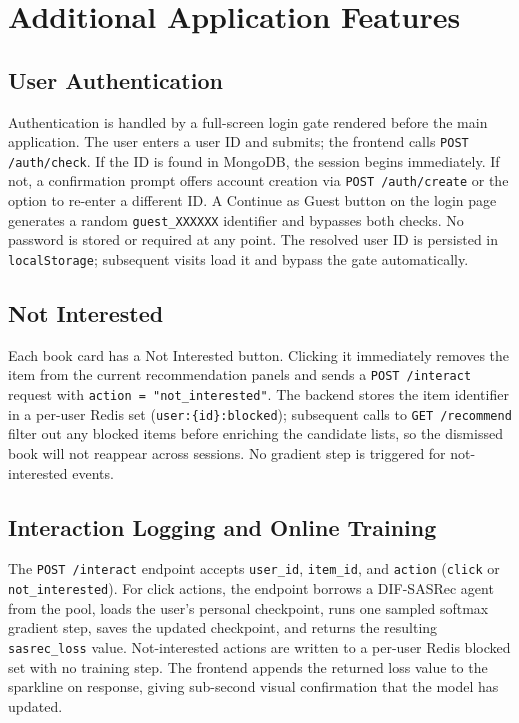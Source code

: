 \section{Additional Application Features}
\label{sec:app_other}

\subsection{User Authentication}

Authentication is handled by a full-screen login gate rendered before the main application.
The user enters a user ID and submits; the frontend calls \texttt{POST /auth/check}. If the ID is found in MongoDB, the session begins immediately. If not, a confirmation prompt offers account creation via \texttt{POST /auth/create} or the option to re-enter a different ID.
A Continue as Guest button on the login page generates a random \texttt{guest\_XXXXXX} identifier and bypasses both checks.
No password is stored or required at any point.
The resolved user ID is persisted in \texttt{localStorage}; subsequent visits load it and bypass the gate automatically.

\subsection{Not Interested}

Each book card has a Not Interested button.
Clicking it immediately removes the item from the current recommendation panels and sends a \texttt{POST /interact} request with \texttt{action = "not\_interested"}.
The backend stores the item identifier in a per-user Redis set (\texttt{user:\{id\}:blocked}); subsequent calls to \texttt{GET /recommend} filter out any blocked items before enriching the candidate lists, so the dismissed book will not reappear across sessions.
No gradient step is triggered for not-interested events.

\subsection{Interaction Logging and Online Training}

The \texttt{POST /interact} endpoint accepts \texttt{user\_id}, \texttt{item\_id}, and \texttt{action} (\texttt{click} or \texttt{not\_interested}).
For click actions, the endpoint borrows a DIF-SASRec agent from the pool, loads the user's personal checkpoint, runs one sampled softmax gradient step, saves the updated checkpoint, and returns the resulting \texttt{sasrec\_loss} value.
Not-interested actions are written to a per-user Redis blocked set with no training step.
The frontend appends the returned loss value to the sparkline on response, giving sub-second visual confirmation that the model has updated.

